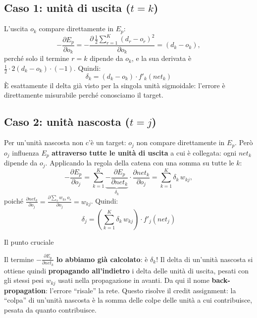 \subsection{\texorpdfstring{Caso 1: unità di uscita
(\(t = k\))}{Caso 1: unità di uscita (t = k)}}\label{caso-1-unituxe0-di-uscita-t-k}

L'uscita \(o_k\) compare direttamente in \(E_p\): \[
-\frac{\partial E_p}{\partial o_k} = -\frac{\partial\,\frac{1}{2}\sum_{r=1}^{K}(d_r - o_r)^2}{\partial o_k} = (d_k - o_k),
\] perché solo il termine \(r = k\) dipende da \(o_k\), e la sua
derivata è \(\frac{1}{2}\cdot 2(d_k - o_k)\cdot(-1)\). Quindi: \[
\boxed{\delta_k = (d_k - o_k)\cdot f'_k(net_k)}
\] È esattamente il delta già visto per la singola unità sigmoidale:
l'errore è direttamente misurabile perché conosciamo il target.

\subsection{\texorpdfstring{Caso 2: unità nascosta
(\(t = j\))}{Caso 2: unità nascosta (t = j)}}\label{caso-2-unituxe0-nascosta-t-j}

Per un'unità nascosta non c'è un target: \(o_j\) non compare
direttamente in \(E_p\). Però \(o_j\) influenza \(E_p\)
\textbf{attraverso tutte le unità di uscita} a cui è collegata: ogni
\(net_k\) dipende da \(o_j\). Applicando la regola della catena con una
somma su tutte le \(k\): \[
-\frac{\partial E_p}{\partial o_j} = \sum_{k=1}^{K}\underbrace{-\frac{\partial E_p}{\partial net_k}}_{\delta_k}\cdot\frac{\partial net_k}{\partial o_j} = \sum_{k=1}^{K}\delta_k\, w_{kj},
\] poiché
\(\frac{\partial net_k}{\partial o_j} = \frac{\partial \sum_s w_{ks}\,o_s}{\partial o_j} = w_{kj}\).
Quindi: \[
\boxed{\delta_j = \left(\sum_{k=1}^{K}\delta_k\, w_{kj}\right)\cdot f'_j(net_j)}
\]

\begin{boxtip}{Il punto cruciale}

Il termine \(-\frac{\partial E_p}{\partial net_k}\) \textbf{lo abbiamo
già calcolato}: è \(\delta_k\)! Il delta di un'unità nascosta si ottiene
quindi \textbf{propagando all'indietro} i delta delle unità di uscita,
pesati con gli stessi pesi \(w_{kj}\) usati nella propagazione in
avanti. Da qui il nome \textbf{back-propagation}: l'errore ``risale'' la
rete. Questo risolve il credit assignment: la ``colpa'' di un'unità
nascosta è la somma delle colpe delle unità a cui contribuisce, pesata
da quanto contribuisce.

\end{boxtip}


